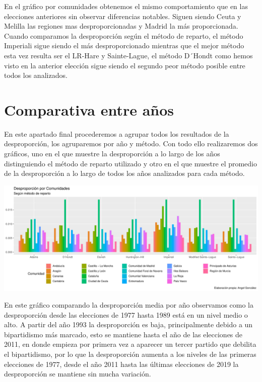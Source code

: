 \documentclass[12pt,a4paper,]{book}
\numberwithin{dummy}{section}
\theoremstyle{ocrenumbox}
\theoremstyle{blacknumex}
\theoremstyle{blacknumbox}
\theoremstyle{ocrenum}
\theoremstyle{ocrenum}
\begin{document}
En el gráfico por comunidades obtenemos el mismo comportamiento que en
las elecciones anteriores sin observar diferencias notables. Siguen
siendo Ceuta y Melilla las regiones mas desproporcionadas y Madrid la
más proporcionada.\\
Cuando comparamos la desproporción según el método de reparto, el método
Imperiali sigue siendo el más desproporcionado mientras que el mejor
método esta vez resulta ser el LR-Hare y Sainte-Lague, el método D´Hondt
como hemos visto en la anterior elección sigue siendo el segundo peor
método posible entre todos los analizados.

\hypertarget{comparativa-entre-auxf1os}{%
\section{Comparativa entre años}\label{comparativa-entre-auxf1os}}

En este apartado final procederemos a agrupar todos los resultados de la
desproporción, los agruparemos por año y método. Con todo ello
realizaremos dos gráficos, uno en el que muestre la desproporción a lo
largo de los años distinguiendo el método de reparto utilizado y otro en
el que muestre el promedio de la desproporción a lo largo de todos los
años analizados para cada método.

\begin{center}\includegraphics[width=1\linewidth]{figurasR/unnamed-chunk-120-1} \end{center}

En este gráfico comparando la desproporción media por año observamos
como la desproporción desde las elecciones de 1977 hasta 1989 está en un
nivel medio o alto. A partir del año 1993 la desproporción es baja,
principalmente debido a un bipartidismo más marcado, esto se mantiene
hasta el año de las elecciones de 2011, en donde empieza por primera vez
a aparecer un tercer partido que debilita el bipartidismo, por lo que la
desproporción aumenta a los niveles de las primeras elecciones de 1977,
desde el año 2011 hasta las últimas elecciones de 2019 la desproporción
se mantiene sin mucha variación.
\end{document}

